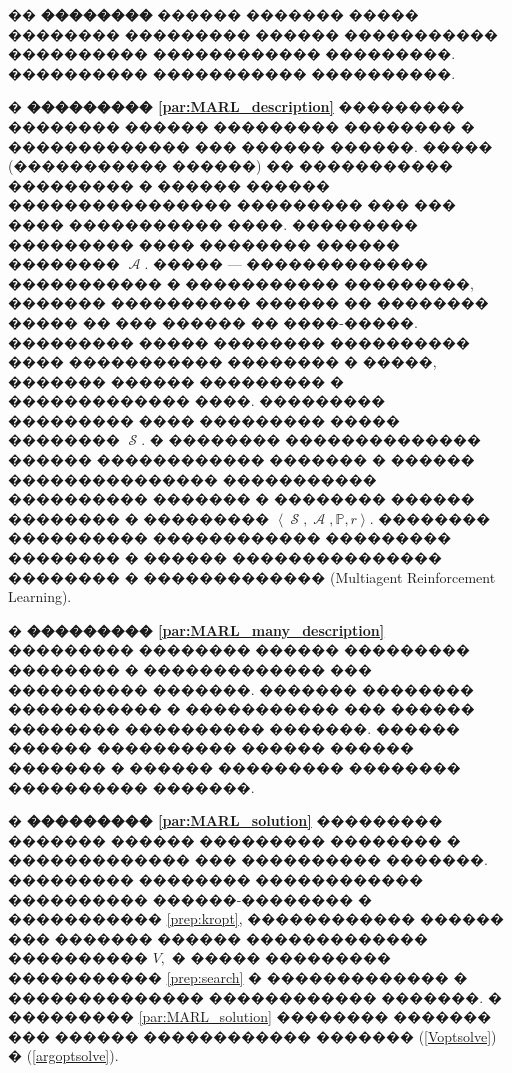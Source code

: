 \documentclass[11pt]{ubs}
\DeclareMathOperator{\state}{\mathcal{S}}
\DeclareMathOperator{\action}{\mathcal{A}}
\begin{document}
�� \textbf{�������� }  ������ ������� ����� �������� ��������� ������ ����������� ���������� ������������ ���������. ���������� ����������� ����������.


� \textbf{��������� \ref{par:MARL_description}} ��������� �������� ������ ��������� �������� � ������������� ��� ������ ������.
����� (����������� ������) �� ����������� ��������� � ������ ������ ���������������� ��������� ��� ��� ���� ����������� ����. ��������� ��������� ���� �������� ������ �������� $\action$. ����� --- ������������� ����������� �  ����������� ���������, ������� ���������� ������ �� �������� ����� �� ��� ������ �� ����-�����. ��������� ����� �������� ���������� ���� ����������� �������� � �����, ������� ������ ��������� � ������������� ����. ��������� ��������� ���� ��������� ����� �������� $\state$.
� �������� �������������� ������ ������������ ������� � ������ ��������������� ����������� ���������� ������� � �������� ������ �������� �  ��������� $\left\langle  \state, \action, \mathbb{P}, r \right\rangle.$
�������� ���������� 
������������ ��������� �������� � ������ ��������������� �������� � ������������� (Multiagent Reinforcement Learning).

� \textbf{��������� \ref{par:MARL_many_description}} ��������� �������� ������ ��������� �������� � ������������� ��� ���������� �������.
������� �������� ����������� � �����������  ��� ������ �������� ���������� �������. 
������ ������ ���������� ������ ������ ������� � ������ ��������� �������� ���������� �������. \newpage

� \textbf{��������� \ref{par:MARL_solution}} ��������� ������� ������ ��������� �������� � ������������� ��� ���������� �������.
��������� �������� ������������ ���������� ������-�������� � ����������� \ref{prep:kropt}, ������������ ������ ��� ������� ������ ������������� ���������� $V,$ � ����� ��������� ����������� \ref{prep:search} � ������������� � �������������� ������������ �������.
� ��������� \ref{par:MARL_solution} �������� ������� ��� ������ ������������ ������� (\ref{Voptsolve}) � (\ref{argoptsolve}).
\end{document}
